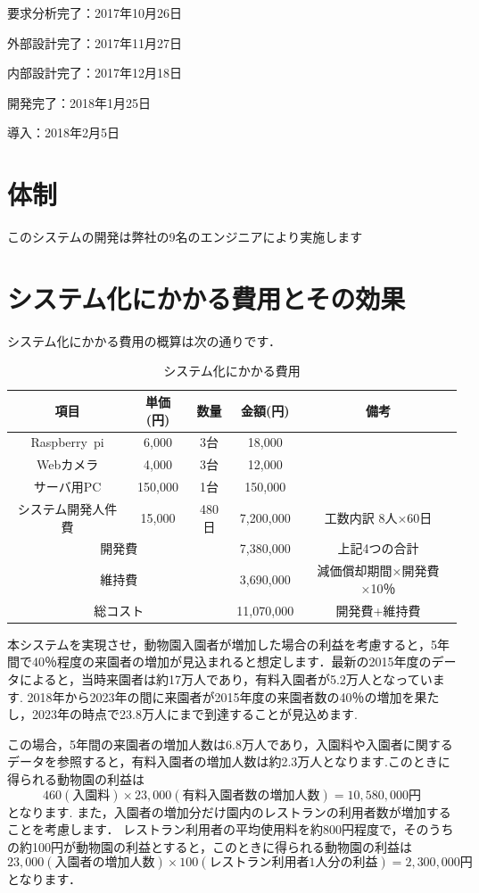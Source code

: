 \documentclass[a4j]{jarticle}
\begin{document}
要求分析完了：2017年10月26日

外部設計完了：2017年11月27日

内部設計完了：2017年12月18日

開発完了：2018年1月25日

導入：2018年2月5日

\section{体制}
このシステムの開発は弊社の9名のエンジニアにより実施します


\section{システム化にかかる費用とその効果}
システム化にかかる費用の概算は次の通りです．
\begin{table}[H]
  \caption{システム化にかかる費用}
  \begin{center}
    \begin{tabular}{|c|c|c|c|c|} \hline
      項目&単価(円)&数量&金額(円)&備考 \\ \hline
      Raspberry~pi&6,000&3台&18,000&　\\ \hline
      Webカメラ&4,000&3台&12,000&　\\ \hline
      サーバ用PC&150,000&1台&150,000&　\\ \hline
      システム開発人件費&15,000&480日&7,200,000&工数内訳 8人×60日 \\ \hline
      \multicolumn{3}{|c|}{開発費}&7,380,000&上記4つの合計 \\ \hline
      \multicolumn{3}{|c|}{維持費}&3,690,000&減価償却期間×開発費×10％ \\ \hline %
      \multicolumn{3}{|c|}{総コスト}&11,070,000&開発費+維持費 \\ \hline
    \end{tabular}
  \end{center}
\end{table}
本システムを実現させ，動物園入園者が増加した場合の利益を考慮すると，5年間で40％程度の来園者の増加が見込まれると想定します．最新の2015年度のデータによると，当時来園者は約17万人であり，有料入園者が5.2万人となっています\cite{ref3}.
2018年から2023年の間に来園者が2015年度の来園者数の40％の増加を果たし，2023年の時点で23.8万人にまで到達することが見込めます.

この場合，5年間の来園者の増加人数は6.8万人であり，入園料や入園者に関するデータ\cite{ref2}\cite{ref3}を参照すると，有料入園者の増加人数は約2.3万人となります.このときに得られる動物園の利益は
\[460(入園料) \times 23,000(有料入園者数の増加人数) = 10,580,000円\]
となります.
また，入園者の増加分だけ園内のレストランの利用者数が増加することを考慮します．
レストラン利用者の平均使用料を約800円程度で，そのうちの約100円が動物園の利益とすると，このときに得られる動物園の利益は
\[23,000(入園者の増加人数) \times 100(レストラン利用者1人分の利益) = 2,300,000円\]
となります．
\end{document}
